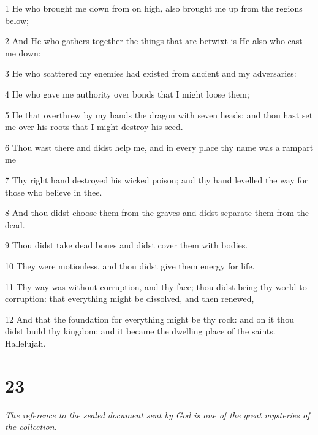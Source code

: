 \par 1 He who brought me down from on high, also brought me up from the regions below;
\par 2 And He who gathers together the things that are betwixt is He also who cast me down:
\par 3 He who scattered my enemies had existed from ancient and my adversaries:
\par 4 He who gave me authority over bonds that I might loose them;
\par 5 He that overthrew by my hands the dragon with seven heads: and thou hast set me over his roots that I might destroy his seed.
\par 6 Thou wast there and didst help me, and in every place thy name was a rampart me
\par 7 Thy right hand destroyed his wicked poison; and thy hand levelled the way for those who believe in thee.
\par 8 And thou didst choose them from the graves and didst separate them from the dead.
\par 9 Thou didst take dead bones and didst cover them with bodies.
\par 10 They were motionless, and thou didst give them energy for life.
\par 11 Thy way was without corruption, and thy face; thou didst bring thy world to corruption: that everything might be dissolved, and then renewed,
\par 12 And that the foundation for everything might be thy rock: and on it thou didst build thy kingdom; and it became the dwelling place of the saints. Hallelujah.

\chapter{23}

\par \textit{The reference to the sealed document sent by God is one of the great mysteries of the collection.}

